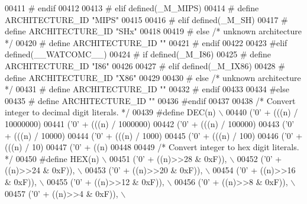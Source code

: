 \begin{DoxyCode}
{{{{{{{{{{{{{{{{{{{{{{{{{{{{{{{{{{{{00411 \textcolor{preprocessor}{#  endif}
00412 
00413 \textcolor{preprocessor}{# elif defined(\_M\_MIPS)}
00414 \textcolor{preprocessor}{#  define ARCHITECTURE\_ID "MIPS"}
00415 
00416 \textcolor{preprocessor}{# elif defined(\_M\_SH)}
00417 \textcolor{preprocessor}{#  define ARCHITECTURE\_ID "SHx"}
00418 
00419 \textcolor{preprocessor}{# else }\textcolor{comment}{/* unknown architecture */}\textcolor{preprocessor}{}
00420 \textcolor{preprocessor}{#  define ARCHITECTURE\_ID ""}
00421 \textcolor{preprocessor}{# endif}
00422 
00423 \textcolor{preprocessor}{#elif defined(\_\_WATCOMC\_\_)}
00424 \textcolor{preprocessor}{# if defined(\_M\_I86)}
00425 \textcolor{preprocessor}{#  define ARCHITECTURE\_ID "I86"}
00426 
00427 \textcolor{preprocessor}{# elif defined(\_M\_IX86)}
00428 \textcolor{preprocessor}{#  define ARCHITECTURE\_ID "X86"}
00429 
00430 \textcolor{preprocessor}{# else }\textcolor{comment}{/* unknown architecture */}\textcolor{preprocessor}{}
00431 \textcolor{preprocessor}{#  define ARCHITECTURE\_ID ""}
00432 \textcolor{preprocessor}{# endif}
00433 
00434 \textcolor{preprocessor}{#else}
00435 \textcolor{preprocessor}{#  define ARCHITECTURE\_ID ""}
00436 \textcolor{preprocessor}{#endif}
00437 
00438 \textcolor{comment}{/* Convert integer to decimal digit literals.  */}
00439 \textcolor{preprocessor}{#define DEC(n)                   \(\backslash\)}
00440 \textcolor{preprocessor}{  ('0' + (((n) / 10000000)%
00441 \textcolor{preprocessor}{  ('0' + (((n) / 1000000)%
00442 \textcolor{preprocessor}{  ('0' + (((n) / 100000)%
00443 \textcolor{preprocessor}{  ('0' + (((n) / 10000)%
00444 \textcolor{preprocessor}{  ('0' + (((n) / 1000)%
00445 \textcolor{preprocessor}{  ('0' + (((n) / 100)%
00446 \textcolor{preprocessor}{  ('0' + (((n) / 10)%
00447 \textcolor{preprocessor}{  ('0' +  ((n) %
00448 
00449 \textcolor{comment}{/* Convert integer to hex digit literals.  */}
00450 \textcolor{preprocessor}{#define HEX(n)             \(\backslash\)}
00451 \textcolor{preprocessor}{  ('0' + ((n)>>28 & 0xF)), \(\backslash\)}
00452 \textcolor{preprocessor}{  ('0' + ((n)>>24 & 0xF)), \(\backslash\)}
00453 \textcolor{preprocessor}{  ('0' + ((n)>>20 & 0xF)), \(\backslash\)}
00454 \textcolor{preprocessor}{  ('0' + ((n)>>16 & 0xF)), \(\backslash\)}
00455 \textcolor{preprocessor}{  ('0' + ((n)>>12 & 0xF)), \(\backslash\)}
00456 \textcolor{preprocessor}{  ('0' + ((n)>>8  & 0xF)), \(\backslash\)}
00457 \textcolor{preprocessor}{  ('0' + ((n)>>4  & 0xF)), \(\backslash\)}
}}}}}}}}}}}}}}}}}}}}}}}}}}}}}}}}}}}}}}}}}}}}
\end{DoxyCode}
